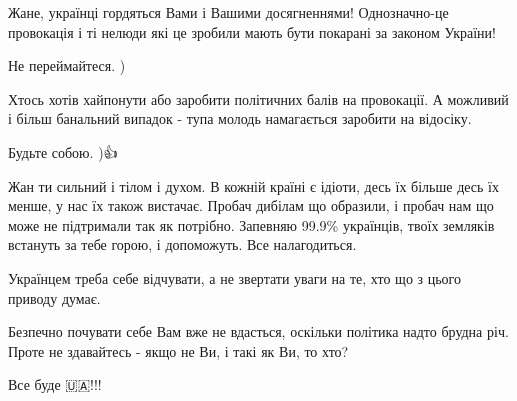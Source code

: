 \begin{itemize}
 

Жане, українці гордяться Вами і Вашими досягненнями! Однозначно-це провокація і
ті нелюди які це зробили мають бути покарані за законом України!


 

Не переймайтеся. )

Хтось хотів хайпонути або заробити політичних балів на провокації. А можливий і
більш банальний випадок - тупа молодь намагається заробити на відосіку.

Будьте собою. )👍

 

Жан ти сильний і тілом і духом. В кожній країні є ідіоти, десь їх більше десь
їх менше, у нас їх також вистачає. Пробач дибілам що образили, і пробач нам що
може не підтримали так як потрібно. Запевняю 99.9\% українців, твоїх земляків
встануть за тебе горою, і допоможуть. Все налагодиться.


 

Українцем треба себе відчувати, а не звертати уваги на те, хто що з цього
приводу думає.

Безпечно почувати себе Вам вже не вдасться, оскільки політика надто брудна річ.
Проте не здавайтесь - якщо не Ви, і такі як Ви, то хто?

Все буде 🇺🇦!!!

 


\end{itemize}
